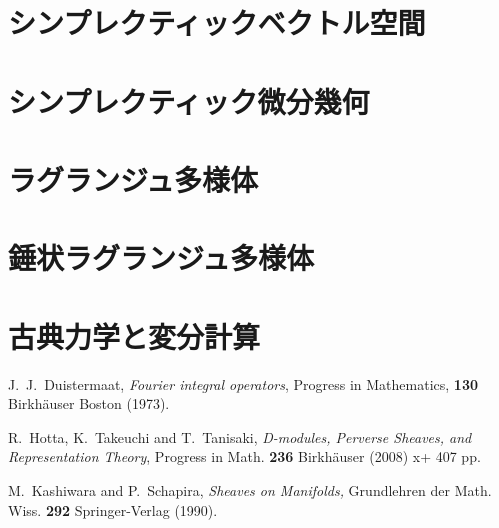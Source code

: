 \documentclass[12pt,leqno]{article}
\theoremstyle{definition}
\numberwithin{equation}{subsection}
\begin{document}
\section{シンプレクティックベクトル空間}
\section{シンプレクティック微分幾何}
\section{ラグランジュ多様体}
\section{錘状ラグランジュ多様体}
\section{古典力学と変分計算}

\providecommand{\bysame}{\leavevmode\hbox to3em{\hrulefill}\thinspace}
\begin{thebibliography}{15}

 J.~J.~Duistermaat,
{\em Fourier integral operators},
Progress in Mathematics, {\bf 130} Birkh\"auser Boston (1973).

 R.~Hotta, K.~Takeuchi and T.~Tanisaki,
\emph{D-modules, Perverse Sheaves, and Representation Theory},
Progress in Math.  {\bf 236} Birkh\"auser (2008) x+ 407 pp.

 M.~Kashiwara and P.~Schapira,
{\em Sheaves on Manifolds,}
\ake Grundlehren der Math. Wiss. {\bf 292} Springer-Verlag (1990).

\end{thebibliography}
\end{document}
